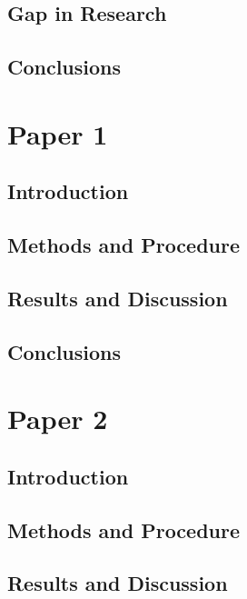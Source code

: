   \section{Gap in Research}\label{sec:}
    \lipsum[42-43]
  \section{Conclusions}\label{sec:}
    \lipsum[12-13]

\chapter{Paper 1}\label{ch:Paper1}
  \section{Introduction}\label{sec:}
    \lipsum[34-36]
  \section{Methods and Procedure}\label{sec:}
    \begin{case}
      \lipsum[10]
    \end{case}
    \begin{case}
      \lipsum[15]
    \end{case}
    \lipsum[46-48]
  \section{Results and Discussion}\label{sec:}
    \lipsum[55-57]
  \section{Conclusions}\label{sec:}
    \lipsum[12-13]
                
\chapter{Paper 2}\label{ch:Paper2}
  \section{Introduction}\label{sec:}
    \lipsum[34-36]
  \section{Methods and Procedure}\label{sec:}
    \lipsum[46-48]
  \section{Results and Discussion}\label{sec:}
    \lipsum[55-57]
